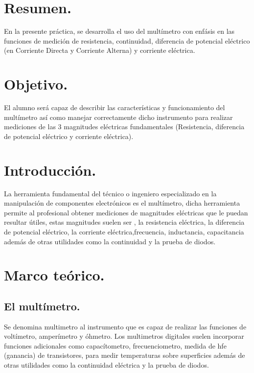 \documentclass[10pt]{article}
\begin{document}
\tableofcontents
\newpage

\section{Resumen.}
En la presente práctica, se desarrolla el uso del multímetro con enfásis en las funciones de medición de resistencia, continuidad, diferencia de potencial eléctrico (en Corriente Directa y Corriente Alterna) y corriente eléctrica. 

\begin{multicols}{2}

\section{Objetivo.}

El alumno será capaz de describir las características y funcionamiento del multímetro así como manejar correctamente dicho instrumento para realizar mediciones de las 3 magnitudes eléctricas fundamentales (Resistencia, diferencia de potencial eléctrico y corriente eléctrica).

\section{Introducción.}

La herramienta fundamental del técnico o ingeniero especializado en la manipulación de componentes electrónicos es el multímetro, dicha herramienta permite al profesional obtener mediciones de magnitudes eléctricas que le puedan resultar útiles,
estas magnitudes suelen ser , la resistencia eléctrica, la diferencia de potencial eléctrico, la corriente eléctrica,frecuencia, inductancia, capacitancia además de otras utilidades como la continuidad y la prueba de diodos.

\section{Marco teórico.}

\subsection{El multímetro.}
Se denomina multimetro al instrumento que es capaz de realizar las funciones de voltímetro, amperímetro y óhmetro. Los multimetros digitales suelen incorporar funciones adicionales como capacítometro, frecuenciometro, medida de hfe (ganancia) de transistores, para medir 
temperaturas sobre superficies además de otras utilidades como la continuidad eléctrica y la prueba de diodos.


\end{multicols}
\end{document}
